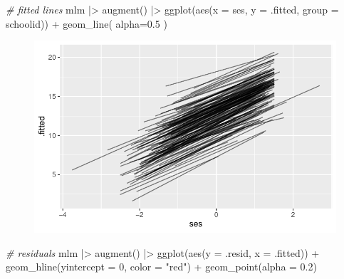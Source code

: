 \documentclass[
  letterpaper,
  DIV=11,
  numbers=noendperiod]{scrreprt}
\newenvironment{Shaded}{\begin{snugshade}}{\end{snugshade}}
\newcommand{\AttributeTok}[1]{\textcolor[rgb]{0.49,0.56,0.16}{#1}}
\newcommand{\CommentTok}[1]{\textcolor[rgb]{0.38,0.63,0.69}{\textit{#1}}}
\newcommand{\DecValTok}[1]{\textcolor[rgb]{0.25,0.63,0.44}{#1}}
\newcommand{\FloatTok}[1]{\textcolor[rgb]{0.25,0.63,0.44}{#1}}
\newcommand{\FunctionTok}[1]{\textcolor[rgb]{0.02,0.16,0.49}{#1}}
\newcommand{\NormalTok}[1]{\textcolor[rgb]{0.00,0.44,0.13}{#1}}
\newcommand{\SpecialCharTok}[1]{\textcolor[rgb]{0.25,0.44,0.63}{#1}}
\newcommand{\StringTok}[1]{\textcolor[rgb]{0.25,0.44,0.63}{#1}}
\begin{document}
\begin{Shaded}
\begin{Highlighting}[]
\CommentTok{\# fitted lines}
\NormalTok{mlm }\SpecialCharTok{|\textgreater{}} 
  \FunctionTok{augment}\NormalTok{() }\SpecialCharTok{|\textgreater{}} 
  \FunctionTok{ggplot}\NormalTok{(}\FunctionTok{aes}\NormalTok{(}\AttributeTok{x =}\NormalTok{ ses, }\AttributeTok{y =}\NormalTok{ .fitted, }\AttributeTok{group =}\NormalTok{ schoolid)) }\SpecialCharTok{+}
  \FunctionTok{geom\_line}\NormalTok{( }\AttributeTok{alpha=}\FloatTok{0.5}\NormalTok{ )}
\end{Highlighting}
\end{Shaded}

\begin{figure}[H]

{\centering \includegraphics{broom_files/figure-pdf/unnamed-chunk-12-1.pdf}

}

\end{figure}

\begin{Shaded}
\begin{Highlighting}[]
\CommentTok{\# residuals}
\NormalTok{mlm }\SpecialCharTok{|\textgreater{}} 
  \FunctionTok{augment}\NormalTok{() }\SpecialCharTok{|\textgreater{}} 
  \FunctionTok{ggplot}\NormalTok{(}\FunctionTok{aes}\NormalTok{(}\AttributeTok{y =}\NormalTok{ .resid, }\AttributeTok{x =}\NormalTok{ .fitted)) }\SpecialCharTok{+}
  \FunctionTok{geom\_hline}\NormalTok{(}\AttributeTok{yintercept =} \DecValTok{0}\NormalTok{, }\AttributeTok{color =} \StringTok{"red"}\NormalTok{) }\SpecialCharTok{+}
  \FunctionTok{geom\_point}\NormalTok{(}\AttributeTok{alpha =} \FloatTok{0.2}\NormalTok{)}
\end{Highlighting}
\end{Shaded}
\end{document}
